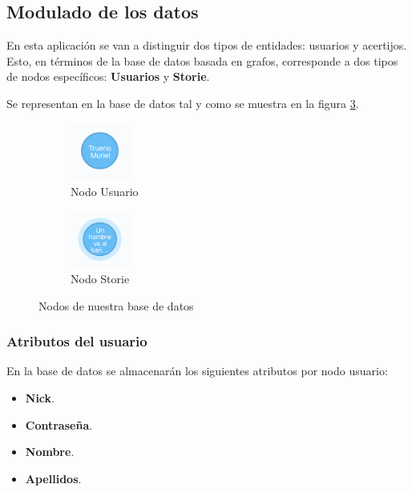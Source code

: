 \subsection{Modulado de los datos}

En esta aplicación se van a distinguir dos tipos de entidades: usuarios y acertijos. Esto, en términos de la base de datos basada en grafos, corresponde a dos tipos de nodos específicos: \textbf{Usuarios} y \textbf{Storie}.


Se representan en la base de datos tal y como se muestra en la figura \ref{fig::nodos}. 

\begin{figure}[hbtp] \centering
\begin{subfigure}{.6\textwidth}
     \centerline{\includegraphics[width=2cm]{figuras/usuario.png}}
    \caption{Nodo Usuario} 
    \label{fig::usernode}
\end{subfigure}
\begin{subfigure}{.6\textwidth}
     \centerline{\includegraphics[width=2cm]{figuras/storie.png}}
    \caption{Nodo Storie} 
    \label{fig::storynode}
\end{subfigure}
\caption{Nodos de nuestra base de datos }
\label{fig::nodos}
\end{figure}

\subsubsection{Atributos del usuario}

En la base de datos se almacenarán los siguientes atributos por nodo usuario:

\begin{itemize}
    \item \textbf{Nick}.
    \item \textbf{Contraseña}.
    \item \textbf{Nombre}.
    \item \textbf{Apellidos}.
\end{itemize}


